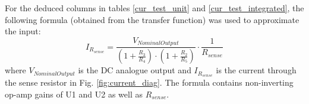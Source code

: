 For the deduced columns in tables \ref{cur_test_unit} and \ref{cur_test_integrated}, the following formula (obtained from the transfer function) was used to approximate the input:$$I_{R_{sense}}=\frac{V_{Nominal Output}}{(1+\frac{R_3}{R_4})\cdot(1+\frac{R_2}{R_5})}\cdot \frac{1}{R_{sense}}$$ where $V_{Nominal Output}$ is the DC analogue output and $I_{R_{sense}}$ is the current through the sense resistor in Fig. \ref{fig:current_diag}. The formula contains non-inverting op-amp gains of U1 and U2 as well as $R_{sense}$.